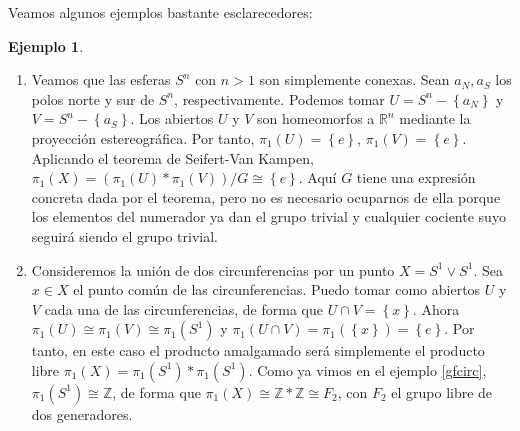 \documentclass[12pt,a4paper]{book}
\theoremstyle{definition} \newtheorem{defn}[thm]{Definición}
\theoremstyle{definition} \newtheorem{ejemplo}[thm]{Ejemplo}
\theoremstyle{definition} \newtheorem{ejercicio}[thm]{Ejercicio}
\theoremstyle{remark} \newtheorem*{obs}{Observación}
\def\ZZ{\mathbb{Z}}
\def\RR{\mathbb{R}}
\def\gf{\pi_1}
\begin{document}
 Veamos algunos ejemplos bastante esclarecedores:
 \begin{ejemplo} \leavevmode
   \begin{enumerate}
     \item Veamos que las esferas $S^n$ con $n>1$ son simplemente conexas. Sean $a_N, a_S$ los polos norte y sur de $S^n$, respectivamente. Podemos tomar $U=S^n-\left\{ a_N \right\}$ y $V=S^n-\left\{ a_S \right\}$. Los abiertos $U$ y $V$ son homeomorfos a $\RR^{n}$ mediante la proyección estereográfica. Por tanto, $\gf(U)=\left\{ e \right\}$, $\gf(V)=\left\{ e \right\}$. Aplicando el teorema de Seifert-Van Kampen, $\gf(X)=(\gf(U)*\gf(V))/G\cong\left\{ e \right\}$. Aquí $G$ tiene una expresión concreta dada por el teorema, pero no es necesario ocuparnos de ella porque los elementos del numerador ya dan el grupo trivial y cualquier cociente suyo seguirá siendo el grupo trivial.

     \item Consideremos la unión de dos circunferencias por un punto $X=S^1\vee S^1$. Sea $x\in X$ el punto común de las circunferencias. Puedo tomar como abiertos $U$ y $V$ cada una de las circunferencias, de forma que $U\cap V=\left\{ x \right\}$. Ahora $\gf(U)\cong \gf(V) \cong \gf(S^1)$ y $\gf(U\cap V)=\gf(\left\{ x \right\})=\left\{ e \right\}$. Por tanto, en este caso el producto amalgamado será simplemente el producto libre $\gf(X)=\gf(S^1)*\gf(S^1)$. Como ya vimos en el ejemplo \ref{gfcirc}, $\gf(S^1)\cong \ZZ$, de forma que $\gf(X)\cong \ZZ*\ZZ \cong F_2$, con $F_2$ el grupo libre de dos generadores.


\end{enumerate}
\end{ejemplo}
\end{document}
